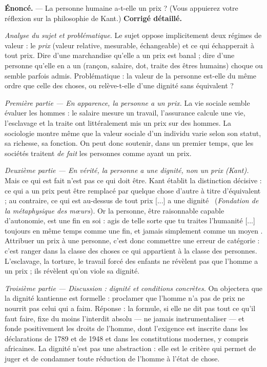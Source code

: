 \documentclass[11pt]{article}
\begin{document}
\begin{exoresolu}
\textbf{Énoncé.} — La personne humaine a-t-elle un prix ? (Vous appuierez votre réflexion sur la philosophie de Kant.)
\tcblower
\textbf{Corrigé détaillé.}

\emph{Analyse du sujet et problématique.} Le sujet oppose implicitement deux régimes de valeur : le \emph{prix} (valeur relative, mesurable, échangeable) et ce qui échapperait à tout prix. Dire d'une marchandise qu'elle a un prix est banal ; dire d'une personne qu'elle en a un (rançon, salaire, dot, traite des êtres humains) choque ou semble parfois admis. Problématique : la valeur de la personne est-elle du même ordre que celle des choses, ou relève-t-elle d'une dignité sans équivalent ?

\emph{Première partie — En apparence, la personne a un prix.} La vie sociale semble évaluer les hommes : le salaire mesure un travail, l'assurance calcule une vie, l'esclavage et la traite ont littéralement mis un prix sur des hommes. La sociologie montre même que la valeur sociale d'un individu varie selon son statut, sa richesse, sa fonction. On peut donc soutenir, dans un premier temps, que les sociétés traitent \emph{de fait} les personnes comme ayant un prix.

\emph{Deuxième partie — En vérité, la personne a une dignité, non un prix (Kant).} Mais ce qui est fait n'est pas ce qui doit être. Kant établit la distinction décisive : \guillemotleft ce qui a un prix peut être remplacé par quelque chose d'autre à titre d'équivalent ; au contraire, ce qui est au-dessus de tout prix [...] a une dignité \guillemotright\ (\emph{Fondation de la métaphysique des mœurs}). Or la personne, être raisonnable capable d'autonomie, est une fin en soi : \guillemotleft agis de telle sorte que tu traites l'humanité [...] toujours en même temps comme une fin, et jamais simplement comme un moyen \guillemotright. Attribuer un prix à une personne, c'est donc commettre une erreur de catégorie : c'est ranger dans la classe des choses ce qui appartient à la classe des personnes. L'esclavage, la torture, le travail forcé des enfants ne révèlent pas que l'homme a un prix ; ils révèlent qu'on viole sa dignité.

\emph{Troisième partie — Discussion : dignité et conditions concrètes.} On objectera que la dignité kantienne est formelle : proclamer que l'homme n'a pas de prix ne nourrit pas celui qui a faim. Réponse : la formule, si elle ne dit pas tout ce qu'il faut faire, fixe du moins l'interdit absolu — ne jamais instrumentaliser — et fonde positivement les droits de l'homme, dont l'exigence est inscrite dans les déclarations de 1789 et de 1948 et dans les constitutions modernes, y compris africaines. La dignité n'est pas une abstraction : elle est le critère qui permet de juger et de condamner toute réduction de l'homme à l'état de chose.


\end{exoresolu}
\end{document}
